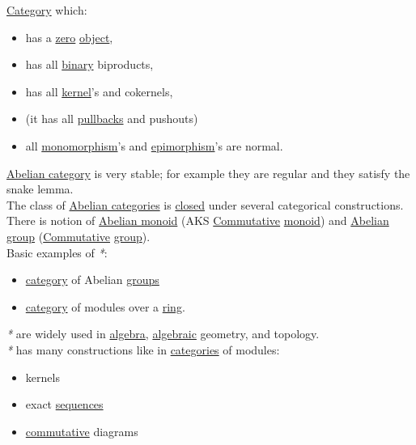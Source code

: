 \documentclass[a4paper,14pt,oneside]{book}
\begin{document}
\hyperref[org74d6ac5]{Category} which:\\
\begin{itemize}
\item has a \hyperref[org6c52cc9]{zero} \hyperref[org920c789]{object},\\
\item has all \hyperref[orgd4bd390]{binary} biproducts,\\
\item has all \hyperref[org78af7b9]{kernel}'s and cokernels,\\
\item (it has all \hyperref[org60d9c2c]{pullbacks} and pushouts)\\
\item all \hyperref[orgd9b6966]{monomorphism}'s and \hyperref[org348452e]{epimorphism}'s are normal.\\
\end{itemize}
\hyperref[org11a0cc9]{Abelian category} is very stable; for example they are regular and they satisfy the snake lemma.\\
The class of \hyperref[orgc9c3397]{Abelian categories} is \hyperref[orga47768f]{closed} under several categorical constructions.\\

There is notion of \hyperref[org9199739]{Abelian monoid} (AKS \hyperref[org02ae3c9]{Commutative} \hyperref[org1b5625d]{monoid}) and \hyperref[org0d57945]{Abelian group} (\hyperref[org02ae3c9]{Commutative} \hyperref[org5f7db57]{group}).\\

Basic examples of \emph{*}:\\
\begin{itemize}
\item \hyperref[org74d6ac5]{category} of Abelian \hyperref[org506ee75]{groups}\\
\item \hyperref[org74d6ac5]{category} of modules over a \hyperref[orgc12bc70]{ring}.\\
\end{itemize}

\emph{*} are widely used in \hyperref[orga3cc81c]{algebra}, \hyperref[orgee35152]{algebraic} geometry, and topology.\\

\emph{*} has many constructions like in \hyperref[org41a3e52]{categories} of modules:\\
\begin{itemize}
\item kernels\\
\item exact \hyperref[org581f8c7]{sequences}\\
\item \hyperref[org02ae3c9]{commutative} diagrams\\
\end{itemize}
\end{document}
